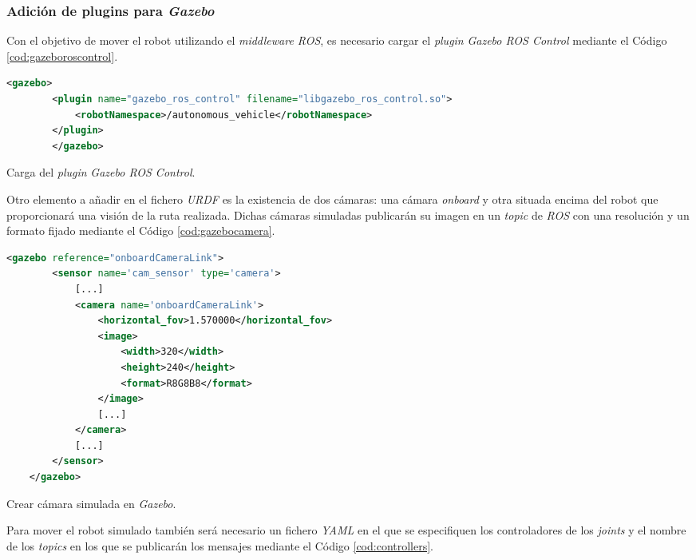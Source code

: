 \subsubsection{Adición de plugins para \textit{Gazebo}}

Con el objetivo de mover el robot utilizando el \textit{middleware ROS}, es necesario cargar el \textit{plugin} \textit{Gazebo ROS Control} mediante el Código \ref{cod:gazeboroscontrol}.\\

\begin{code}[h]
	\begin{lstlisting}[language=XML]
		<gazebo>
		<plugin name="gazebo_ros_control" filename="libgazebo_ros_control.so">
			<robotNamespace>/autonomous_vehicle</robotNamespace>
		</plugin>
		</gazebo>
	\end{lstlisting}
	\caption[Carga del \textit{plugin} \textit{Gazebo ROS Control}.]{Carga del \textit{plugin} \textit{Gazebo ROS Control}.}
	\label{cod:gazeboroscontrol}
\end{code}

Otro elemento a añadir en el fichero \textit{URDF} es la existencia de dos cámaras: una cámara \textit{onboard} y otra situada encima del robot que proporcionará una visión de la ruta realizada. Dichas cámaras simuladas publicarán su imagen en un \textit{topic} de \textit{ROS} con una resolución y un formato fijado mediante el Código \ref{cod:gazebocamera}.\\

\begin{code}[h]
	\begin{lstlisting}[language=XML]
	<gazebo reference="onboardCameraLink">
		<sensor name='cam_sensor' type='camera'>
			[...]
			<camera name='onboardCameraLink'>
				<horizontal_fov>1.570000</horizontal_fov>
				<image>
					<width>320</width>
					<height>240</height>
					<format>R8G8B8</format>
				</image>
				[...]
			</camera>
			[...]
		</sensor>
	</gazebo>
	\end{lstlisting}
	\caption[Crear cámara simulada en \textit{Gazebo}.]{Crear cámara simulada en \textit{Gazebo}.}
	\label{cod:gazebocamera}
\end{code}

Para mover el robot simulado también será necesario un fichero \textit{YAML} en el que se especifiquen los controladores de los \textit{joints} y el nombre de los \textit{topics} en los que se publicarán los mensajes mediante el Código \ref{cod:controllers}.\\

